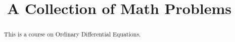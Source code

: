 \documentclass[12pt]{xourse}
\title{A Collection of Math Problems}
\begin{document}
\begin{abstract}
This is a course on Ordinary Differential Equations. 
\end{abstract} 

\maketitle
{}
\end{document}
